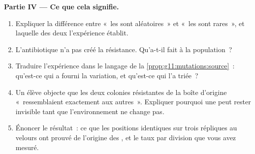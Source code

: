 \begin{problem}
\medskip
\noindent\textbf{Partie IV --- Ce que cela signifie.}
\begin{enumerate}[resume]
  \item Expliquer la différence entre «~les  sont
        aléatoires~» et «~les  sont rares~», et laquelle des
        deux l'expérience établit.
  \item L'antibiotique n'a pas créé la résistance. Qu'a-t-il fait à la
        population~?
  \item Traduire l'expérience dans le langage de la
        \cref{prop:g11:mutations:source}~: qu'est-ce qui a fourni la
        variation, et qu'est-ce qui l'a triée~?
  \item Un élève objecte que les deux colonies résistantes de la boîte
        d'origine «~ressemblaient exactement aux autres~». Expliquer
        pourquoi une  peut rester invisible tant que
        l'environnement ne change pas.
  \item Énoncer le résultat~: ce que les positions identiques sur trois
        répliques au velours ont prouvé de l'origine des , et
        le taux par division que vous avez mesuré.
\end{enumerate}
\end{problem}
